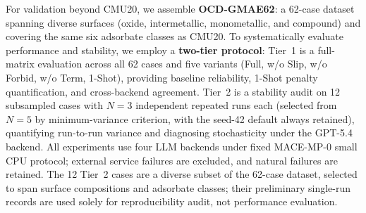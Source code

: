 For validation beyond CMU20, we assemble \textbf{OCD-GMAE62}: a 62-case dataset spanning diverse surfaces (oxide, intermetallic, monometallic, and compound) and covering the same six adsorbate classes as CMU20.
To systematically evaluate performance and stability, we employ a \textbf{two-tier protocol}:
Tier~1 is a full-matrix evaluation across all 62 cases and five variants (Full, w/o Slip, w/o Forbid, w/o Term, 1-Shot), providing baseline reliability, 1-Shot penalty quantification, and cross-backend agreement.
Tier~2 is a stability audit on 12 subsampled cases with $N=3$ independent repeated runs each (selected from $N=5$ by minimum-variance criterion, with the seed-42 default always retained), quantifying run-to-run variance and diagnosing stochasticity under the GPT-5.4 backend.
All experiments use four LLM backends under fixed MACE-MP-0 small CPU protocol; external service failures are excluded, and natural failures are retained.
The 12 Tier~2 cases are a diverse subset of the 62-case dataset, selected to span surface compositions and adsorbate classes; their preliminary single-run records are used solely for reproducibility audit, not performance evaluation.
